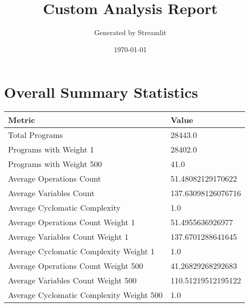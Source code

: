\documentclass{article}
\begin{document}
    \title{Custom Analysis Report}
    \author{Generated by Streamlit}
    \date{\today}
    \maketitle

    \section{Overall Summary Statistics}
    \begin{tabular}{ll}
    \toprule
    Metric & Value \\
    \midrule
    Total Programs & 28443.0 \\ 
Programs with Weight 1 & 28402.0 \\ 
Programs with Weight 500 & 41.0 \\ 
Average Operations Count & 51.48082129170622 \\ 
Average Variables Count & 137.63098126076716 \\ 
Average Cyclomatic Complexity & 1.0 \\ 
Average Operations Count Weight 1 & 51.4955636926977 \\ 
Average Variables Count Weight 1 & 137.6701288641645 \\ 
Average Cyclomatic Complexity Weight 1 & 1.0 \\ 
Average Operations Count Weight 500 & 41.26829268292683 \\ 
Average Variables Count Weight 500 & 110.51219512195122 \\ 
Average Cyclomatic Complexity Weight 500 & 1.0 \\ 

    \bottomrule
    \end{tabular}
\end{document}
